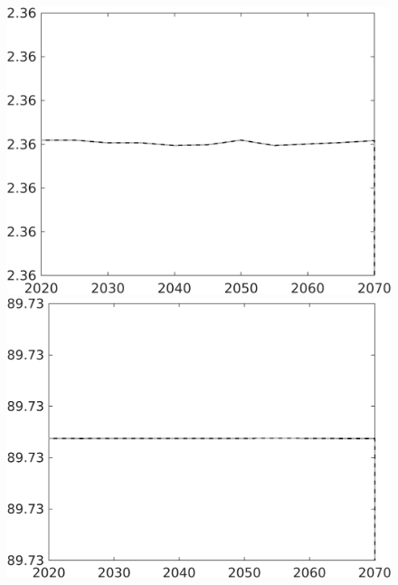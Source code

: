 \begin{figure}[h!!]
\begin{minipage}[]{0.32\textwidth}
	\end{minipage}	
	\begin{minipage}[]{0.32\textwidth}
		\includegraphics[width=1\textwidth]{../../codding_model/own_basedOnFried/optimalPol_010922_revision/figures/all_13Sept22/CompTaul_Equlab_LFBAU_Reg0_gAn_spillover0_nsk1_xgr1_knspil1_sep1_countec0_GovRev1_etaa0.79_lgd0.png}
	\end{minipage}	
	\begin{minipage}[]{0.32\textwidth}
		\includegraphics[width=1\textwidth]{../../codding_model/own_basedOnFried/optimalPol_010922_revision/figures/all_13Sept22/CompTaul_Equlab_LFBAU_Reg0_gAg_spillover0_nsk1_xgr1_knspil1_sep1_countec0_GovRev1_etaa0.79_lgd0.png}

\end{minipage}
\end{figure}
